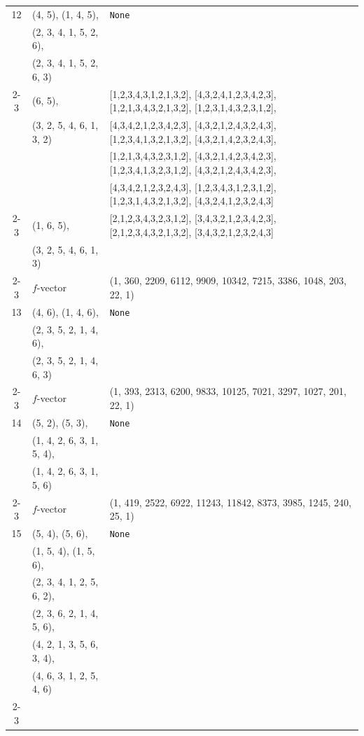 \documentclass[10pt]{amsart}
\numberwithin{equation}{section}
\theoremstyle{plain}
\theoremstyle{definition}
\theoremstyle{remark}
\begin{document}
{\begin{longtable}{c|l|l}
		12 & (4, 5), (1, 4, 5), & \texttt{None} \\
		& (2, 3, 4, 1, 5, 2, 6), &  \\
		& (2, 3, 4, 1, 5, 2, 6, 3) &  \\ \cline{2-3}
		
		& (6, 5), & [1,2,3,4,3,1,2,1,3,2], [4,3,2,4,1,2,3,4,2,3], [1,2,1,3,4,3,2,1,3,2], [1,2,3,1,4,3,2,3,1,2], \\
		& (3, 2, 5, 4, 6, 1, 3, 2) & [4,3,4,2,1,2,3,4,2,3], [4,3,2,1,2,4,3,2,4,3], [1,2,3,4,1,3,2,1,3,2], [4,3,2,1,4,2,3,2,4,3], \\
		&  & [1,2,1,3,4,3,2,3,1,2], [4,3,2,1,4,2,3,4,2,3], [1,2,3,4,1,3,2,3,1,2], [4,3,2,1,2,4,3,4,2,3], \\
		&  & [4,3,4,2,1,2,3,2,4,3], [1,2,3,4,3,1,2,3,1,2], [1,2,3,1,4,3,2,1,3,2], [4,3,2,4,1,2,3,2,4,3] \\ \cline{2-3}
		
		& (1, 6, 5), & [2,1,2,3,4,3,2,3,1,2], [3,4,3,2,1,2,3,4,2,3], [2,1,2,3,4,3,2,1,3,2], [3,4,3,2,1,2,3,2,4,3] \\
		& (3, 2, 5, 4, 6, 1, 3) &  \\ \cline{2-3}
		
		& $f$-vector & {(1, 360, 2209, 6112, 9909, 10342, 7215, 3386, 1048, 203, 22, 1)} \\
		\midrule
		
		13 & (4, 6), (1, 4, 6), & \texttt{None} \\
		& (2, 3, 5, 2, 1, 4, 6), &  \\
		& (2, 3, 5, 2, 1, 4, 6, 3) &  \\ \cline{2-3}
		
		& $f$-vector & {(1, 393, 2313, 6200, 9833, 10125, 7021, 3297, 1027, 201, 22, 1)} \\
		\midrule
		
		14 & (5, 2), (5, 3), & \texttt{None} \\
		& (1, 4, 2, 6, 3, 1, 5, 4), &  \\
		& (1, 4, 2, 6, 3, 1, 5, 6) &  \\ \cline{2-3}
		
		& $f$-vector & {(1, 419, 2522, 6922, 11243, 11842, 8373, 3985, 1245, 240, 25, 1)} \\
		\midrule
		
		15 & (5, 4), (5, 6), & \texttt{None} \\
		& (1, 5, 4), (1, 5, 6), &  \\
		& (2, 3, 4, 1, 2, 5, 6, 2), &  \\
		& (2, 3, 6, 2, 1, 4, 5, 6), &  \\
		& (4, 2, 1, 3, 5, 6, 3, 4), &  \\
		& (4, 6, 3, 1, 2, 5, 4, 6) &  \\ \cline{2-3}
		

\end{longtable}}
\end{document}
